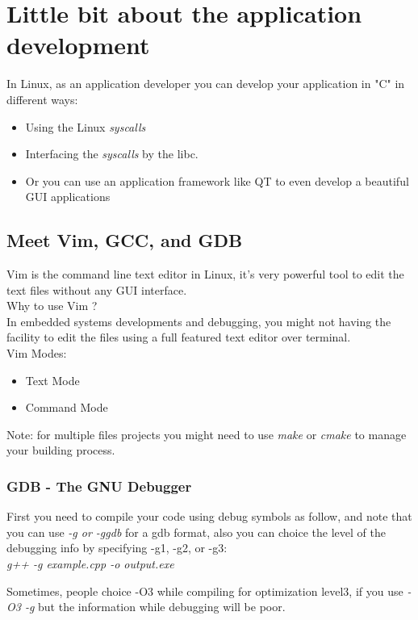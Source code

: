 \documentclass{article}
\begin{document}
\section{Little bit about the application development}

In Linux, as an application developer you can develop your application in "C" in different ways:
\begin{itemize}
    \item Using the Linux \textit{syscalls}
    \item Interfacing the \textit{syscalls} by the libc.
    \item Or you can use an application framework like QT to even develop a beautiful GUI applications 
\end{itemize}

\subsection{Meet Vim, GCC, and GDB}
Vim is the command line text editor in Linux, it's very powerful tool to edit the text files without any GUI interface.\\
Why to use Vim ?\\
In embedded systems developments and debugging, you might not having the facility to edit the files using a full featured text editor over terminal.\\ 

Vim Modes:
\begin{itemize}
    \item Text Mode
    \item Command Mode
\end{itemize}

Note: for multiple files projects you might need to use \textit{make} or \textit{cmake} to manage your building process.


\subsubsection{GDB - The GNU Debugger}
First you need to compile your code using debug symbols as follow, and note that you can use \textit{-g or -ggdb} for a gdb format, also you can choice the level of the debugging info by specifying -g1, -g2, or -g3:\\
\textit{g++ -g example.cpp -o output.exe}

Sometimes, people choice -O3 while compiling for optimization level3, if you use \textit{-O3 -g} but the information while debugging will be poor.\\
\end{document}
